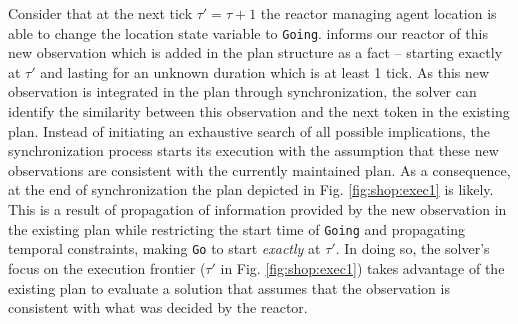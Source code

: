 Consider that at the next tick $\tau' = \tau+1$ the reactor managing
agent location is able to change the location state variable to
\texttt{Going}. \rx informs our reactor of this new observation which
is added in the plan structure as a fact -- starting exactly at
$\tau'$ and lasting for an unknown duration which is at least 1
tick. As this new observation is integrated in the plan through
synchronization, the solver can identify the similarity between this
observation and the next token in the existing plan. Instead of
initiating an exhaustive search of all possible implications, the
synchronization process starts its execution with the assumption that
these new observations are consistent with the currently maintained
plan. As a consequence, at the end of synchronization the plan
depicted in Fig. \ref{fig:shop:exec1} is likely. This is a result of
propagation of information provided by the new observation in the
existing plan while restricting the start time of \texttt{Going} and
propagating temporal constraints, making \texttt{Go} to start {\em
  exactly} at $\tau'$. In doing so, the \eu solver's focus on the
execution frontier ($\tau'$ in Fig. \ref{fig:shop:exec1}) takes
advantage of the existing plan to evaluate a solution that assumes
that the observation is consistent with what was decided by the
reactor.


